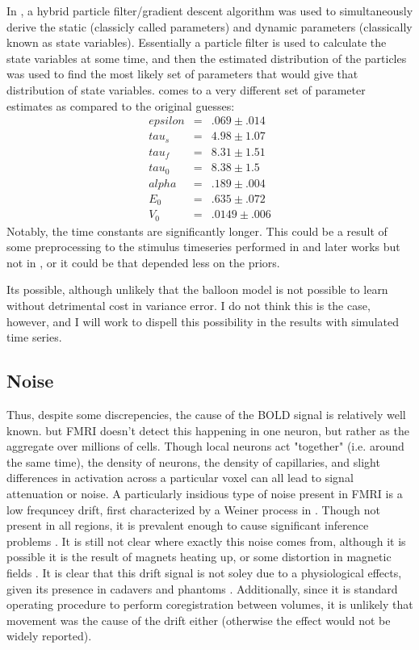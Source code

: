 \documentclass{article}
\begin{document}
In \cite{Jonston2008}, a hybrid particle filter/gradient
descent algorithm was used to simultaneously derive the static (classicly called
parameters) and dynamic parameters (classically known as state variables).
Essentially a particle filter is used to calculate the state variables at some
time, and then the estimated distribution of the particles was used to find
the most likely set of parameters that would give that distribution of state variables.
\cite{Johnston2008} comes to a very different set of parameter estimates as compared
to the original \cite{Friston2000} guesses:
\begin{eqnarray}
epsilon &=& .069 \pm .014    \nonumber \\
tau_s & =& 4.98 \pm 1.07  \nonumber \\
tau_f & =& 8.31 \pm 1.51   \nonumber \\
tau_0 & =& 8.38 \pm 1.5    \nonumber \\
alpha & =& .189 \pm .004   \nonumber \\
E_0   & =& .635 \pm .072     \nonumber \\
V_0   & =& .0149 \pm .006     \nonumber 
\end{eqnarray}
Notably, the time constants are significantly longer. This could be a result of
some preprocessing to the stimulus timeseries performed in \cite{Friston2002} and
later works but not in \cite{Johnston2008}, or it could be that \cite{Johnston2008}
depended less on the priors. 

Its possible, although unlikely that the balloon model is not possible to learn
without detrimental cost in variance error. I do not think this is the case, however,
and I will work to dispell this possibility in the results with simulated time
series.

\subsection{Noise}
Thus, despite some discrepencies, the cause of the BOLD signal is
relatively well known.  but FMRI doesn't detect this happening in one neuron,
but rather as the 
aggregate over millions of cells. Though local neurons act
"together" (i.e. around the same time), the density of neurons, the
density of capillaries, and slight differences in activation across 
a particular voxel can all lead to signal attenuation or noise. 
A particularly insidious type of noise present in FMRI is a low frequncey
drift, first characterized by a Weiner process in \cite{Riera2004}. 
Though not present in all regions, it is prevalent enough to cause significant
inference problems \cite{Tanabe2002}. It is still not
clear where exactly this noise comes from, although it is possible it is 
the result of magnets heating up, or some distortion in magnetic
fields \cite{Smith2007}. It is clear that this drift signal is not soley
due to a physiological
effects, given its presence in cadavers and phantoms \cite{Smith1999}.
Additionally, since it is standard operating procedure to perform
coregistration between volumes, it is unlikely that movement was
the cause of the drift either (otherwise the effect would not be 
widely reported).
\end{document}

